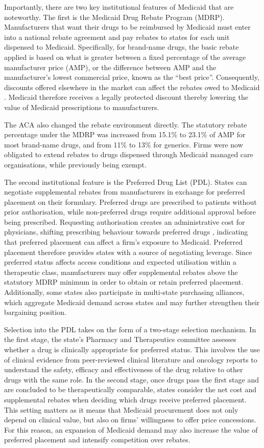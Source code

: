 \documentclass[12pt]{article}
\begin{document}
Importantly, there are two key institutional features of Medicaid that are noteworthy. The first is the Medicaid Drug Rebate Program (MDRP). Manufacturers that want their drugs to be reimbursed by Medicaid must enter into a national rebate agreement and pay rebates to states for each unit dispensed to Medicaid. Specifically, for brand-name drugs, the basic rebate applied is based on what is greater between a fixed percentage of the average manufacturer price (AMP), or the difference between AMP and the manufacturer's lowest commercial price, known as the ``best price''. Consequently, discounts offered elsewhere in the market can affect the rebates owed to Medicaid \citep{duggan2006distortionary}. Medicaid therefore receives a legally protected discount thereby lowering the value of Medicaid prescriptions to manufacturers.

The ACA also changed the rebate environment directly. The statutory rebate percentage under the MDRP was increased from 15.1\% to 23.1\% of AMP for most brand-name drugs, and from 11\% to 13\% for generics. Firms were now obligated to extend rebates to drugs dispensed through Medicaid managed care organisations, while previously being exempt.

The second institutional feature is the Preferred Drug List (PDL). States can negotiate supplemental rebates from manufacturers in exchange for preferred placement on their formulary. Preferred drugs are prescribed to patients without prior authorisation, while non-preferred drugs require additional approval before being prescribed. Requesting authorisation creates an administrative cost for physicians, shifting prescribing behaviour towards preferred drugs \citep{virabhak2009impact}, indicating that preferred placement can affect a firm's exposure to Medicaid. Preferred placement therefore provides states with a source of negotiating leverage. Since preferred status affects access conditions and expected utilisation within a therapeutic class, manufacturers may offer supplemental rebates above the statutory MDRP minimum in order to obtain or retain preferred placement. Additionally, some states also participate in multi-state purchasing alliances, which aggregate Medicaid demand across states and may further strengthen their bargaining position.

Selection into the PDL takes on the form of a two-stage selection mechanism. In the first stage, the state's Pharmacy and Therapeutics committee assesses whether a drug is clinically appropriate for preferred status. This involves the use of clinical evidence from peer-reviewed clinical literature and oncology reports to understand the safety, efficacy and effectiveness of the drug relative to other drugs with the same role. In the second stage, once drugs pass the first stage and are concluded to be therapeutically comparable, states consider the net cost and supplemental rebates when deciding which drugs receive preferred placement. This setting matters as it means that Medicaid procurement does not only depend on clinical value, but also on firms' willingness to offer price concessions. For this reason, an expansion of Medicaid demand may also increase the value of preferred placement and intensify competition over rebates.
\end{document}

